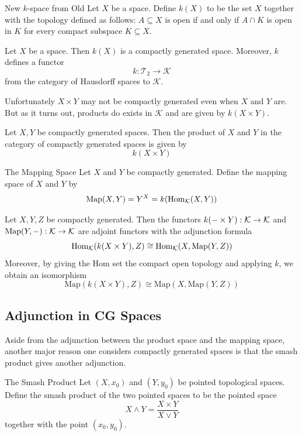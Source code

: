 \documentclass[a4paper]{article}
\begin{document}
\begin{defn}{New $k$-space from Old}{} Let $X$ be a space. Define $k(X)$ to be the set $X$ together with the topology defined as follows: $A\subseteq X$ is open if and only if $A\cap K$ is open in $K$ for every compact subspace $K\subseteq X$. 
\end{defn}

\begin{lmm}{}{} Let $X$ be a space. Then $k(X)$ is a compactly generated space. Moreover, $k$ defines a functor $$k:\mathcal{T}_2\to\mathcal{K}$$ from the category of Hausdorff spaces to $\mathcal{K}$. 
\end{lmm}

Unfortunately $X\times Y$ may not be compactly generated even when $X$ and $Y$ are. But as it turns out, products do exists in $\mathcal{K}$ and are given by $k(X\times Y)$. 

\begin{prp}{}{} Let $X,Y$ be compactly generated spaces. Then the product of $X$ and $Y$ in the category of compactly generated spaces is given by $$k(X\times Y)$$
\end{prp}

\begin{defn}{The Mapping Space}{} Let $X$ and $Y$ be compactly generated. Define the mapping space of $X$ and $Y$ by $$\text{Map}(X,Y)=Y^X=k(\operatorname{Hom}_{\mathcal{K}}(X,Y))$$
\end{defn}

\begin{thm}{}{} Let $X,Y,Z$ be compactly generated. Then the functors $k(-\times Y):\mathcal{K}\to\mathcal{K}$ and $\text{Map}(Y,-):\mathcal{K}\to\mathcal{K}$ are adjoint functors with the adjunction formula $$\operatorname{Hom}_{\mathcal{K}}(k(X\times Y),Z)\cong\operatorname{Hom}_{\mathcal{K}}(X,\text{Map}(Y,Z))$$ Moreover, by giving the Hom set the compact open topology and applying $k$, we obtain an isomorphism $$\text{Map}(k(X\times Y),Z)\cong\text{Map}(X,\text{Map}(Y,Z))$$
\end{thm}

\subsection{Adjunction in CG Spaces}
Aside from the adjunction between the product space and the mapping space, another major reason one considers compactly generated spaces is that the smash product gives another adjunction. 

\begin{defn}{The Smash Product}{} Let $(X,x_0)$ and $(Y,y_0)$ be pointed topological spaces. Define the smash product of the two pointed spaces to be the pointed space $$X\wedge Y=\frac{X\times Y}{X\vee Y}$$ together with the point $(x_0,y_0)$. 
\end{defn}
\end{document}
